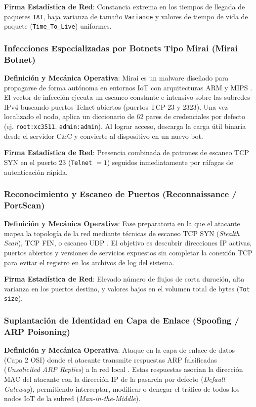 \textbf{Firma Estadística de Red}: Constancia extrema en los tiempos de llegada de paquetes \texttt{IAT}, baja varianza de tamaño \texttt{Variance} y valores de tiempo de vida de paquete (\texttt{Time\_To\_Live}) uniformes.

\subsubsection{Infecciones Especializadas por Botnets Tipo Mirai (Mirai Botnet)}
\textbf{Definición y Mecánica Operativa}: Mirai es un malware diseñado para propagarse de forma autónoma en entornos IoT con arquitecturas ARM y MIPS \citep{neto2023}. El vector de infección ejecuta un escaneo constante e intensivo sobre las subredes IPv4 buscando puertos Telnet abiertos (puertos TCP 23 y 2323). Una vez localizado el nodo, aplica un diccionario de 62 pares de credenciales por defecto (ej. \texttt{root:xc3511}, \texttt{admin:admin}). Al lograr acceso, descarga la carga útil binaria desde el servidor C\&C y convierte al dispositivo en un nuevo bot.

\textbf{Firma Estadística de Red}: Presencia combinada de patrones de escaneo TCP SYN en el puerto 23 (\texttt{Telnet} $= 1$) seguidos inmediatamente por ráfagas de autenticación rápida.

\subsubsection{Reconocimiento y Escaneo de Puertos (Reconnaissance / PortScan)}
\textbf{Definición y Mecánica Operativa}: Fase preparatoria en la que el atacante mapea la topología de la red mediante técnicas de escaneo TCP SYN (\textit{Stealth Scan}), TCP FIN, o escaneo UDP \citep{ciciot2023}. El objetivo es descubrir direcciones IP activas, puertos abiertos y versiones de servicios expuestos sin completar la conexión TCP para evitar el registro en los archivos de log del sistema.

\textbf{Firma Estadística de Red}: Elevado número de flujos de corta duración, alta varianza en los puertos destino, y valores bajos en el volumen total de bytes (\texttt{Tot size}).

\subsubsection{Suplantación de Identidad en Capa de Enlace (Spoofing / ARP Poisoning)}
\textbf{Definición y Mecánica Operativa}: Ataque en la capa de enlace de datos (Capa 2 OSI) donde el atacante transmite respuestas ARP falsificadas (\textit{Unsolicited ARP Replies}) a la red local \citep{zhang2024}. Estas respuestas asocian la dirección MAC del atacante con la dirección IP de la pasarela por defecto (\textit{Default Gateway}), permitiendo interceptar, modificar o denegar el tráfico de todos los nodos IoT de la subred (\textit{Man-in-the-Middle}).

